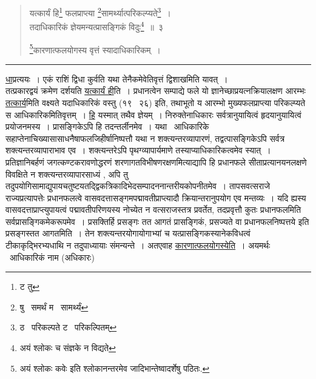 \documentclass[11pt, openany]{book}
\begin{document}
\newpage

\begin{quote}
{\na यत्कार्यं हि\renewcommand{\thefootnote}{1}\footnote{ट तु} फलप्राप्त्या \renewcommand{\thefootnote}{2}\footnote{षु \textendash\ समर्थं म \textendash\ सामर्थ्यं}सामर्थ्यात्परिकल्प्यते\renewcommand{\thefootnote}{3}\footnote{ठ \textendash\ परिकल्पते ट \textendash\ परिकल्पितम्}~।\\
तदाधिकारिकं ज्ञेयमन्यत्प्रासङ्गिकं विदुः\renewcommand{\thefootnote}{4}\footnote{अयं श्लोकः च संज्ञके न विद्यते}~॥~३

\renewcommand{\thefootnote}{5}\footnote{अयं श्लोकः {\qt कवेः} इति श्लोकानन्तरमेव जादिभान्तेष्वादर्शेषु पठितः.}कारणात्फलयोगस्य वृत्तं स्यादाधिकारिकम्~।}
\end{quote}

\hrule

\vspace{2mm}
\noindent
\underline{धा}प्रत्ययः~। एकं राशिं द्विधा कुर्वति यथा तेनैकमेवेतिवृत्तं द्विशाखमिति यावत्~।\\

तत्प्रकारद्वयं क्रमेण दर्शयति \underline{यत्कार्यं ही}ति~। प्रधानत्वेन सम्पाद्ये फले यो ज्ञानेच्छाप्रयत्नक्रियालक्षण आरम्भः \underline{तत्कार्य}मिति वक्ष्यते {\qt यदाधिकारिकं वस्तु} (१९ \textendash\ २६) इति, तथाभूतो य आरम्भो मुख्यफलप्राप्त्या परिकल्प्यते स आधिकारिकमितिवृत्तम्~। \underline{हि} यस्मात् तथैव ज्ञेयम्~। निरुक्तेनाधिकारः सर्वत्रानुयायित्वं हृदयानुयायित्वं प्रयोजनमस्य~। प्रासङ्गिकेऽपि हि तदन्तर्लीनमेव~। यथा \textendash\ आधिकारिके सहाप्तेनाचिख्यासासाधनैषाफलजिहीर्षानिष्पत्तौ यथा न शक्त्यन्तरव्यापारणं, तद्वत्पासङ्गिकेऽपि सर्वत्र शक्त्यन्तरव्यापाराभाव एव~। शक्त्यन्तरेऽपि पृथग्व्यापार्यमाणे तस्याप्याधिकारिकत्वमेव स्यात्~। प्रतिज्ञानिबर्हणं जगत्कण्टकरावणोद्धरणं शरणागतविभीषणरक्षणमित्याद्यापि हि प्रधानफले सीताप्रत्यानयनलक्षणे विवक्षिते न शक्त्यन्तरव्यापारसाध्यं , अपि तु तदुपयोगिसामाद्युपायचतुष्टयतद्द्विकत्रिकादिभेदसम्पादननान्तरीयकोपनीतमेव~। तापसवत्सराजे राज्यप्रत्यापत्तेः प्रधानफलत्वे वासवदत्तासङ्गमपद्मावतीप्राप्त्यादौ क्रियान्तरानुपयोग एव मन्तव्यः~। यदि ह्यस्य वासवदत्ताप्राप्त्युपायत्वं पद्मावतीपरिणयस्य नोच्येत न वत्सराजस्तत्र प्रवर्तेत, तदप्रवृत्तौ कुतः प्रधानफलमिति सर्वप्रासङ्गिकमेकरूपमेव~। प्रसक्तिर्हि प्रसङ्गः तत आगतं प्रासङ्गिकं, प्रसज्यते वा प्रधानफलनिष्पत्तये इति प्रसङ्गस्तत आगतमिति~। तेन शक्त्यन्तरयोगायोगाभ्यां च यत्प्रासङ्गिकस्यानेकविधत्वं टीकाकृद्भिरभ्यधाथि न तदुपाध्यायाः संमन्यन्ते~। अतएवाह \underline{कारणात्फलयोगस्येति}~। अयमर्थः \textendash\ आधिकारिकं नाम (अधिकारः)

\newpage
\end{document}

